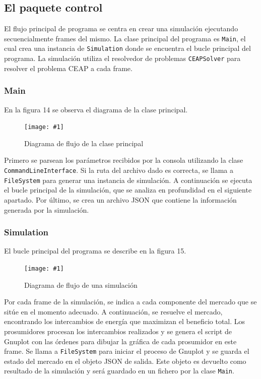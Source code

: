 \documentclass[12pt,a4paper,openright,oneside]{article}
\newcommand{\includeImage}[3]
{
	\begin{figure}[H]
	\begin{center}
	\texttt{[image: \#1]}
	\end{center}
	\caption{#3}
	\end{figure}
}
\numberwithin{equation}{section}
\theoremstyle{definition}
\begin{document}
\subsection{El paquete control}
El flujo principal de programa se centra en crear una simulación ejecutando secuencialmente frames del mismo. La clase principal del programa es \texttt{Main}, el cual crea una instancia de \texttt{Simulation} donde se encuentra el bucle principal del programa. La simulación utiliza el resolvedor de problemas \texttt{CEAPSolver} para resolver el problema CEAP a cada frame.
\subsubsection{Main}

En la figura 14 se observa el diagrama de la clase principal.

\includeImage{flow_main.png}{5}{Diagrama de flujo de la clase principal}


Primero se parsean los parámetros recibidos por la consola utilizando la clase \texttt{CommandLineInterface}. Si la ruta del archivo dado es correcta, se llama a \texttt{FileSystem} para generar una instancia de simulación. A continuación se ejecuta el bucle principal de la simulación, que se analiza en profundidad en el siguiente apartado. Por último, se crea un archivo JSON que contiene la información generada por la simulación.

\subsubsection{Simulation}

El bucle principal del programa se describe en la figura 15.
\includeImage{flow_simulation.png}{4}{Diagrama de flujo de una simulación}

Por cada frame de la simulación, se indica a cada componente del mercado que se sitúe en el momento adecuado. A continuación, se resuelve el mercado, encontrando los intercambios de energía que maximizan el beneficio total. Los prosumidores procesan los intercambios realizados y se genera el script de Gnuplot con las órdenes para dibujar la gráfica de cada prosumidor en este frame. Se llama a \texttt{FileSystem} para iniciar el proceso de Gnuplot y se guarda el estado del mercado en el objeto JSON de salida. Este objeto es devuelto como resultado de la simulación y será guardado en un fichero por la clase \texttt{Main}.
\end{document}
